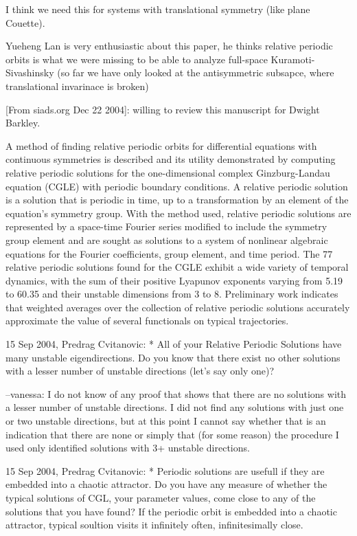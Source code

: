 I think we need this for systems with translational symmetry (like plane
Couette).

Yueheng Lan is very enthusiastic about this
paper, he thinks relative periodic orbits is what we were missing to
be able to analyze full-space Kuramoti-Sivashinsky (so far we have
only looked at the antisymmetric subsapce, where translational invarinace
is broken)

[From siads\@siam.org  Dec 22 2004]:
willing to review this manuscript for Dwight Barkley.
     
A method of finding relative periodic orbits for differential equations with 
continuous symmetries is described and its utility demonstrated by computing 
relative periodic solutions for the one-dimensional complex Ginzburg-Landau 
equation (CGLE) with periodic boundary conditions.  A relative periodic solution is 
a solution that is periodic in time, up to a transformation by an element of the 
equation's symmetry group.  With the method used, relative periodic solutions are 
represented by a space-time Fourier series modified to include the symmetry 
group element and are sought as solutions to a system of nonlinear algebraic 
equations for the Fourier coefficients, group element, and time period. The 77 
relative periodic solutions found for the CGLE exhibit a wide variety of temporal 
dynamics, with the sum of their positive Lyapunov exponents varying from 5.19 to 
60.35 and their unstable dimensions from 3 to 8. Preliminary work indicates that 
weighted averages over the collection of relative periodic solutions accurately 
approximate the value of several functionals on typical trajectories.

15 Sep 2004, Predrag Cvitanovic:
* All of your Relative Periodic Solutions have many unstable
eigendirections. Do you know that there exist no other solutions with a
lesser number of unstable directions (let's say only one)?

--vanessa:
I do not know of any proof that shows that there are no solutions with a
lesser number of unstable directions.  I did not find any solutions with
just one or two unstable directions, but at this point I cannot say
whether that is an indication that there are none or simply that (for some
reason) the procedure I used only identified solutions with 3+ unstable
directions.

15 Sep 2004, Predrag Cvitanovic:
* Periodic solutions are usefull if they are embedded into a chaotic
attractor. Do you have any measure of whether the typical solutions of
CGL, your parameter values, come close to any of the solutions that you
have found? If the periodic orbit is embedded into a chaotic attractor,
typical soultion visits it infinitely often, infinitesimally close.

